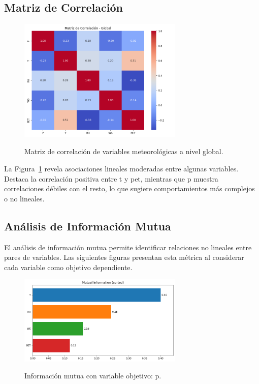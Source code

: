 \subsection{Matriz de Correlación}

\begin{figure}[htbp]
    \centering
    \caption{Matriz de correlación de variables meteorológicas a nivel global.}
    \includegraphics[width=0.7\textwidth]{resultados/global/bivariado/matriz_correlacion.png}
    \label{fig:matriz_correlacion}
\end{figure}

La Figura~\ref{fig:matriz_correlacion} revela asociaciones lineales moderadas entre algunas variables. Destaca la correlación positiva entre \gls{t} y \gls{pet}, mientras que \gls{p} muestra correlaciones débiles con el resto, lo que sugiere comportamientos más complejos o no lineales.

\subsection{Análisis de Información Mutua}

El análisis de información mutua permite identificar relaciones no lineales entre pares de variables. Las siguientes figuras presentan esta métrica al considerar cada variable como objetivo dependiente.

\begin{figure}[htbp]
    \centering
    \caption{Información mutua con variable objetivo: \gls{p}.}
    \includegraphics[width=0.7\textwidth]{resultados/global/bivariado/mutual_info_P.png}
    \label{fig:mutual_info_P}
\end{figure}

